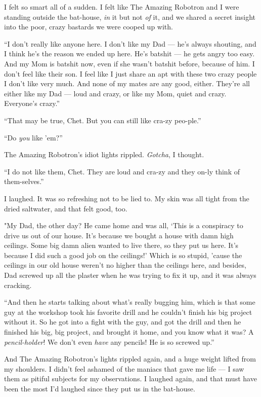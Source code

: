 I felt so smart all of a sudden. I felt like The Amazing Robotron
and I were standing outside the bat-house, \emph{in} it but not
\emph{of} it, and we shared a secret insight into the poor, crazy
bastards we were cooped up with.

``I don't really like anyone here. I don't like my Dad --- he's always 
shouting, and I think he's the reason we ended up here. He's batshit --- he 
gets angry too easy. And my Mom is batshit now, even if she wasn't batshit 
before, because of him. I don't feel like their son. I feel like I just share 
an apt with these two crazy people I don't like very much. And none of my mates 
are any good, either. They're all either like my Dad --- loud and crazy, or 
like my Mom, quiet and crazy. Everyone's crazy.''

``That may be true, Chet. But you can still like cra-zy peo-ple.''

``Do \emph{you} like 'em?''

The Amazing Robotron's idiot lights rippled. \emph{Gotcha}, I
thought.

``I do not like them, Chet. They are loud and cra-zy and they on-ly think of 
them-selves.''

I laughed. It was so refreshing not to be lied to. My skin was all
tight from the dried saltwater, and that felt good, too.

"My Dad, the other day? He came home and was all,
`This is a conspiracy to drive us out of our house. It's because we bought a 
house with damn high ceilings. Some big damn alien wanted to live there, so 
they put us here. It's because I did such a good job on the ceilings!'
Which is so stupid, 'cause the ceilings in our old house weren't no
higher than the ceilings here, and besides, Dad screwed up all the
plaster when he was trying to fix it up, and it was always
cracking.

``And then he starts talking about what's really bugging him, which is that 
some guy at the workshop took his favorite drill and he couldn't finish his big 
project without it. So he got into a fight with the guy, and got the drill and 
then he finished his big, big project, and brought it home, and you know what 
it was? A \emph{pencil-holder}! We don't even \emph{have} any pencils! He is so 
screwed up.''

And The Amazing Robotron's lights rippled again, and a huge weight
lifted from my shoulders. I didn't feel ashamed of the maniacs that
gave me life --- I saw them as pitiful subjects for my
observations. I laughed again, and that must have been the most I'd
laughed since they put us in the bat-house.

